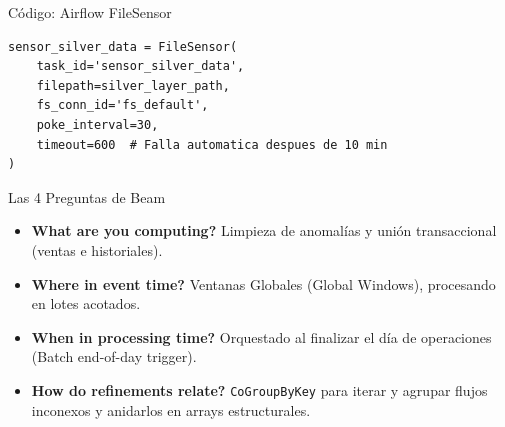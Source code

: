\documentclass{beamer}
\begin{document}
\begin{frame}[fragile]{Código: Airflow FileSensor}
\begin{Verbatim}[fontsize=\footnotesize]
sensor_silver_data = FileSensor(
    task_id='sensor_silver_data',
    filepath=silver_layer_path,
    fs_conn_id='fs_default',
    poke_interval=30,
    timeout=600  # Falla automatica despues de 10 min
)
\end{Verbatim}
\end{frame}

\begin{frame}{Las 4 Preguntas de Beam}
    \begin{itemize}
        \item \textbf{What are you computing?} Limpieza de anomalías y unión transaccional (ventas e historiales).
        \item \textbf{Where in event time?} Ventanas Globales (Global Windows), procesando en lotes acotados.
        \item \textbf{When in processing time?} Orquestado al finalizar el día de operaciones (Batch end-of-day trigger).
        \item \textbf{How do refinements relate?} \texttt{CoGroupByKey} para iterar y agrupar flujos inconexos y anidarlos en arrays estructurales.
    \end{itemize}
\end{frame}
\end{document}
